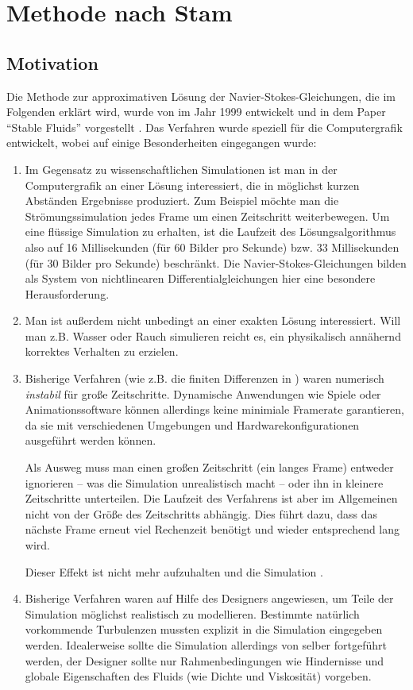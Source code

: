 \section{Methode nach Stam}

\subsection{Motivation}

Die Methode zur approximativen Lösung der Navier-Stokes-Gleichungen, die im
Folgenden erklärt wird, wurde von  im Jahr 1999 entwickelt
und in dem Paper "`Stable Fluids"' vorgestellt \cite{Stam1999}. Das Verfahren
wurde speziell für die Computergrafik entwickelt, wobei auf einige
Besonderheiten eingegangen wurde:

\begin{enumerate}
\item
	Im Gegensatz zu wissenschaftlichen Simulationen ist man in der
	Computergrafik an einer Lösung interessiert, die in möglichst kurzen
	Abständen Ergebnisse produziert. Zum Beispiel möchte man die
	Strömungssimulation jedes Frame um einen Zeitschritt weiterbewegen. Um
	eine flüssige Simulation zu erhalten, ist die Laufzeit des
	Lösungsalgorithmus also auf 16 Millisekunden (für 60 Bilder pro Sekunde)
	bzw. 33 Millisekunden (für 30 Bilder pro Sekunde) beschränkt. Die
	Navier-Stokes-Gleichungen bilden als System von nichtlinearen
	Differentialgleichungen hier eine besondere Herausforderung.
\item
	Man ist außerdem nicht unbedingt an einer exakten Lösung interessiert.
	Will man z.B. Wasser oder Rauch simulieren reicht es, ein physikalisch
	annähernd korrektes Verhalten zu erzielen.
\item
	Bisherige Verfahren (wie z.B. die finiten Differenzen in
	\cite{Foster1997}) waren numerisch \emph{instabil} für große
	Zeitschritte. Dynamische Anwendungen wie Spiele oder Animationssoftware
	können allerdings keine minimiale Framerate garantieren, da sie mit
	verschiedenen Umgebungen und Hardwarekonfigurationen ausgeführt werden
	können.

	Als Ausweg muss man einen großen Zeitschritt (ein langes Frame) entweder
	ignorieren -- was die Simulation unrealistisch macht -- oder ihn in
	kleinere Zeitschritte unterteilen. Die Laufzeit des Verfahrens ist aber
	im Allgemeinen nicht von der Größe des Zeitschritts abhängig. Dies führt
	dazu, dass das nächste Frame erneut viel Rechenzeit benötigt und wieder
	entsprechend lang wird.

	Dieser Effekt ist nicht mehr aufzuhalten und die Simulation
	.
\item
	Bisherige Verfahren waren auf Hilfe des Designers angewiesen, um Teile
	der Simulation möglichst realistisch zu modellieren. Bestimmte natürlich
	vorkommende Turbulenzen mussten explizit in die Simulation eingegeben
	werden. Idealerweise sollte die Simulation allerdings von selber
	fortgeführt werden, der Designer sollte nur Rahmenbedingungen wie
	Hindernisse und globale Eigenschaften des Fluids (wie Dichte und
	Viskosität) vorgeben.
\end{enumerate}

